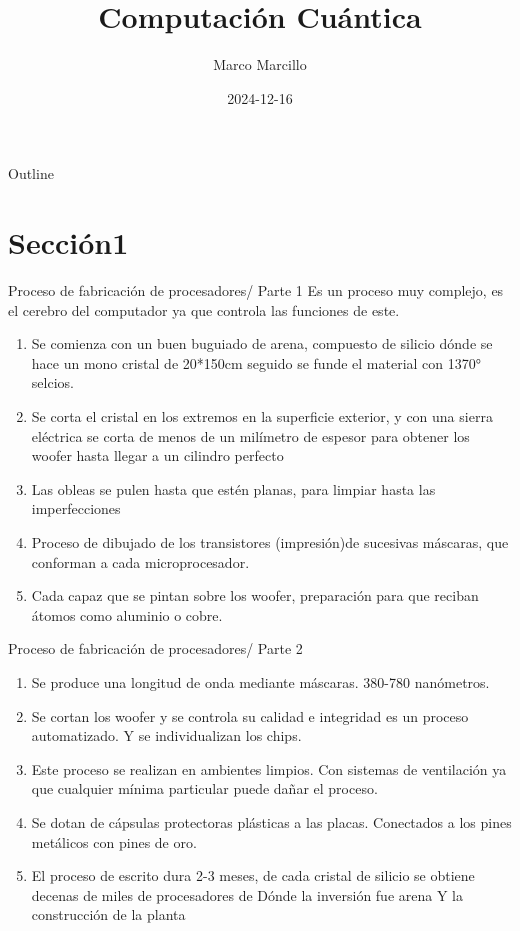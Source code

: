 \documentclass[presentation]{beamer}
\author{Marco Marcillo}
\date{2024-12-16}
\title{Computación Cuántica}
\begin{document}
\maketitle
\begin{frame}{Outline}
\tableofcontents
\end{frame}


\section{Sección1}
\label{sec:org1a73b66}

\begin{frame}[label={sec:orgff4a182}]{Proceso de fabricación de procesadores/ Parte 1}
\alert{\alert{Es un proceso muy complejo, es el cerebro del computador ya que controla las funciones de este.}}
\begin{enumerate}
\item Se comienza con un buen buguiado de arena, compuesto de silicio dónde se hace un mono cristal de 20*150cm seguido se funde el material con 1370° selcios.
\item Se corta el cristal en los extremos en la superficie exterior, y con una sierra eléctrica se corta de menos de un milímetro de espesor para obtener los woofer hasta llegar a un cilindro perfecto
\item Las obleas se pulen hasta que estén planas, para limpiar hasta las imperfecciones
\item Proceso de dibujado de los transistores (impresión)de sucesivas máscaras, que conforman a cada microprocesador.
\item Cada capaz que se pintan sobre los woofer, preparación para que reciban átomos como aluminio o cobre.
\end{enumerate}
\end{frame}


\begin{frame}[label={sec:org3d1975c}]{Proceso de fabricación de procesadores/ Parte 2}
\begin{enumerate}
\item Se produce una longitud de onda mediante máscaras. 380-780 nanómetros.
\item Se cortan los woofer y se controla su calidad e integridad es un proceso automatizado. Y se individualizan los chips.
\item Este proceso se realizan en ambientes limpios. Con sistemas de ventilación ya que cualquier mínima particular puede dañar el proceso.
\item Se dotan de cápsulas protectoras plásticas a las placas. Conectados a los pines metálicos con pines de oro.
\item El proceso de escrito dura 2-3 meses, de cada cristal de silicio se obtiene decenas de miles de procesadores de Dónde la inversión fue arena Y la construcción de la planta
\end{enumerate}
\end{frame}
\end{document}
